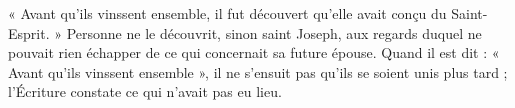 « Avant qu’ils vinssent ensemble, il fut découvert qu’elle avait conçu du Saint-Esprit. » Personne ne le découvrit, sinon saint Joseph, aux regards duquel ne pouvait rien échapper de ce qui concernait sa future épouse. Quand il est dit : « Avant qu’ils vinssent ensemble », il ne s’ensuit pas qu’ils se soient unis plus tard ; l’Écriture constate ce qui n’avait pas eu lieu.